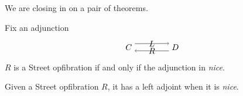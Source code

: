 %
%



\newcommand{\nice}{\emph{nice}}



We are closing in on a pair of theorems.

\begin{thm}
	Fix an adjunction 
	\[
	\begin{tikzpicture}
		\node (C) at (0,0) {$ C $}	;
		\node (D) at (2,0) {$ D $}	;
		\draw [->] (C.30) to node {$ L $} (D.150);
		\draw [->] (D.210) to node [swap] {$ R $} (C.-30);
	\end{tikzpicture}
	\]
	$ R $ is a Street opfibration if and only if the adjunction in \nice.	
\end{thm}

\begin{theorem}
	Given a Street opfibration $ R $, it has a left adjoint when it is \nice.
\end{theorem}
















